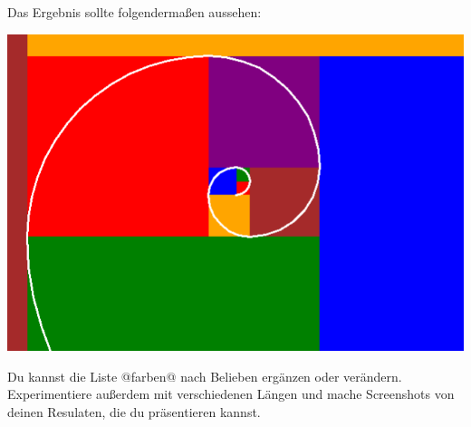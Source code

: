 \begin{enumerate}[(a)]
        Das Ergebnis sollte folgendermaßen aussehen:
        \begin{center}  
            \includegraphics[scale=0.35]{img/fib_color}
        \end{center}
        
        Du kannst die Liste @farben@ nach Belieben ergänzen oder verändern. Experimentiere außerdem mit verschiedenen Längen und mache Screenshots von deinen Resulaten, die du präsentieren kannst.
    \end{enumerate}

